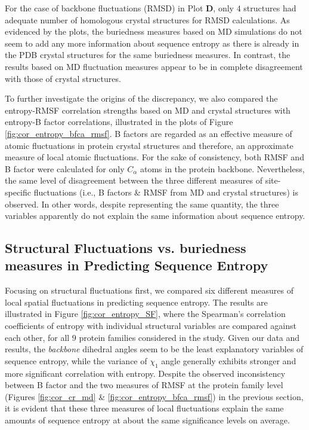 \documentclass[12pt]{article}
\begin{document}
For the case of backbone fluctuations (RMSD) in Plot {\bf D}, only $4$ structures had adequate number of homologous crystal structures for RMSD calculations. As evidenced by the plots, the buriedness measures based on MD simulations do not seem to add any more information about sequence entropy as there is already in the PDB crystal structures for the same buriedness measures. In contrast, the results based on MD fluctuation measures appear to be in complete disagreement with those of crystal structures.

To further investigate the origins of the discrepancy, we also compared the entropy-RMSF correlation strengths based on MD and crystal structures with entropy-B factor correlations, illustrated in the plots of Figure \ref{fig:cor_entropy_bfca_rmsf}. B factors are regarded as an effective measure of atomic fluctuations in protein crystal structures and therefore, an approximate measure of local atomic fluctuations. For the sake of consistency, both RMSF and B factor were calculated for only $C_\alpha$ atoms in the protein backbone. Nevertheless, the same level of disagreement between the three different measures of site-specific fluctuations (i.e., B factors \& RMSF from MD and crystal structures) is observed. In other words, despite representing the same quantity, the three variables apparently do not explain the same information about sequence entropy.

\subsection*{Structural Fluctuations vs. buriedness measures in Predicting Sequence Entropy}

Focusing on structural fluctuations first, we compared six different measures of local spatial fluctuations in predicting sequence entropy. The results are illustrated in Figure \ref{fig:cor_entropy_SF}, where the Spearman's correlation coefficients of entropy with individual structural variables are compared against each other, for all $9$ protein families considered in the study. Given our data and results, the {\it backbone} dihedral angles seem to be the least explanatory variables of sequence entropy, while the variance of $\chi_1$ angle generally exhibits stronger and more significant correlation with entropy. Despite the observed inconsistency between B factor and the two measures of RMSF at the protein family level (Figures \ref{fig:cor_cr_md} \& \ref{fig:cor_entropy_bfca_rmsf}) in the previous section, it is evident that these three measures of local fluctuations explain the same amounts of sequence entropy at about the same significance levels on average.
\end{document}
